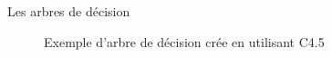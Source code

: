 \documentclass[a4paper, 11pt]{report}
\begin{document}
\begin{chapter}{Les arbres de décision}
\begin{figure}[h!]
\begin{center}
\end{center}
\caption{Exemple d'arbre de décision crée en utilisant C4.5}
\end{figure}

\end{chapter}
\end{document}
